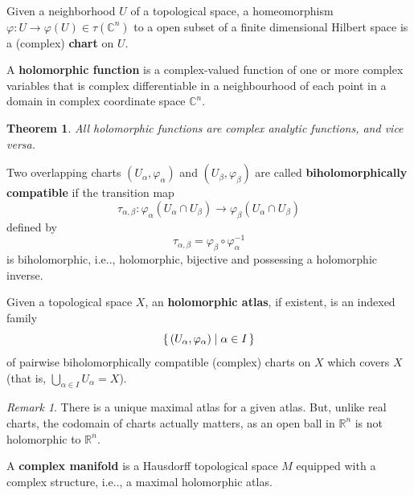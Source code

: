 \documentclass[12pt, letterpaper]{article}
\makeatletter
\newcommand{\re}{\mathbb{R}}
\newcommand{\co}{\mathbb{C}}
\newcommand\ie{i.e\@ifnextchar.{}{.\@}}
\newtheorem{thm}[prop]{Theorem}
\theoremstyle{definition}
\theoremstyle{remark}
\newtheorem*{rem*}{Remark}
\theoremstyle{definition}
\theoremstyle{plain}
\numberwithin{equation}{section}
\makeatother
\begin{document}
	\begin{def*}
		Given a neighborhood $U$ of a topological space, a homeomorphism $\varphi \colon U \to \varphi(U) \in\tau(\co ^{n})$
		to a open subset of a finite dimensional Hilbert space is a (complex) \textbf{chart} on $U$.
	\end{def*}
	
	\begin{def*}
		A \textbf{holomorphic function} is a complex-valued function of one or more complex variables
		that is complex differentiable in a neighbourhood of each point in a domain in complex coordinate space $\co^n$.
	\end{def*}
	\begin{thm}
		All holomorphic functions are complex analytic functions, and vice versa.
	\end{thm}

	\begin{def*}
		Two overlapping charts $(U_{\alpha },\varphi _{\alpha })$ and $(U_{\beta },\varphi _{\beta })$
		are called \textbf{biholomorphically
		compatible} if the transition map
		\[ \tau _{\alpha ,\beta }\colon\varphi _{\alpha }(U_{\alpha }\cap U_{\beta })\to \varphi _{\beta }(U_{\alpha }\cap U_{\beta })\]
		defined by
		\[\tau _{\alpha ,\beta }=\varphi _{\beta }\circ \varphi _{\alpha }^{-1}\]
		is biholomorphic, \ie, holomorphic, bijective and possessing a holomorphic inverse.
	\end{def*}

	

	\begin{def*}
		Given a topological space $X$,
		an \textbf{holomorphic atlas}, if existent, is an indexed family 
		\[\set{(U_{\alpha },\varphi _{\alpha })|\alpha \in I}\]
		of pairwise biholomorphically
		compatible (complex) charts on $X$ which covers $X$ (that is, $\bigcup _{\alpha \in I}U_{\alpha }=X$).
	\end{def*}
	\begin{rem*}
		There is a unique maximal atlas for a given atlas.
		But, unlike real charts, the codomain of charts actually matters,
		as an open ball in $\re^n$ is not holomorphic to $\re^n$.
	\end{rem*}
	
	\begin{def*}
		A \textbf{complex manifold} is a Hausdorff topological space $M$ equipped
		with a complex structure, \ie, a maximal holomorphic atlas.
	\end{def*}
\end{document}
